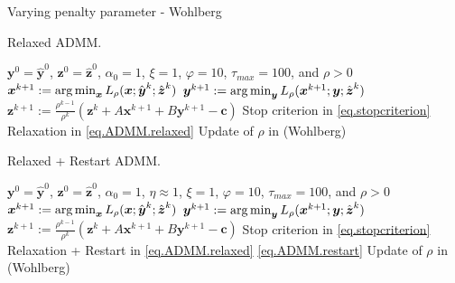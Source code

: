 \documentclass[8pt,red]{beamer}
\theoremstyle{plain}
\theoremstyle{definition}
\theoremstyle{remark}
\newcommand{\refalg}[1]{Algorithm~\ref{#1}}
\newcommand{\argmin}{\operatornamewithlimits{\mathrm{arg\,min}}}
\newcommand{\bi}[1]{\ensuremath{\boldsymbol{#1}}}
\begin{document}
\begin{frame}{Varying penalty parameter - Wohlberg}
\begin{algorithm}[H]
  \scriptsize
  \caption{Relaxed ADMM.}
  \label{alg:prototype.vp-R-Wohlberg}
  \begin{algorithmic}[1]
    \Require
    $\bi{y}^{0} = \hat{\bi{y}}^{0}$, $\bi{z}^{0}=\hat{\bi{z}}^{0}$, $\alpha_{0}=1$, $\xi = 1$, $\varphi = 10$, $\tau_{max} = 100$, and $\rho > 0$ 
    \State
    $\bi{x}^{k+1} 
    := \argmin_{\bi{x}} L_{\rho}(\bi{x};\hat{\bi{y}}^{k};\hat{\bi{z}}^{k})$ 
    \State
    $\bi{y}^{k+1} 
    := \argmin_{\bi{y}} L_{\rho}(\bi{x}^{k+1};\bi{y};\hat{\bi{z}}^{k})$ 
    \State
    $\bi{z}^{k+1} 
  := \frac{\rho^{k-1}}{\rho^{k}} \left( \bi{z}^{k} + A \bi{x}^{k+1} + B \bi{y}^{k+1} - \bi{c} \right)$ 
    \State
    Stop criterion in \eqref{eq.stopcriterion}
    \State
    Relaxation in \eqref{eq.ADMM.relaxed}
    \State
    Update of $\rho$ in (Wohlberg)
    \EndFor
  \end{algorithmic}
\end{algorithm}

\begin{algorithm}[H]
  \scriptsize
  \caption{Relaxed + Restart ADMM.}
  \label{alg:prototype.vp-RR-Wohlberg}
  \begin{algorithmic}[1]
    \Require
    $\bi{y}^{0} = \hat{\bi{y}}^{0}$, $\bi{z}^{0}=\hat{\bi{z}}^{0}$, 
    $\alpha_{0}=1$, $\eta \approx 1$, $\xi = 1$, $\varphi = 10$, $\tau_{max} = 100$, and $\rho > 0$ 
    \State
    $\bi{x}^{k+1} 
    := \argmin_{\bi{x}} L_{\rho}(\bi{x};\hat{\bi{y}}^{k};\hat{\bi{z}}^{k})$ 
    \State
    $\bi{y}^{k+1} 
    := \argmin_{\bi{y}} L_{\rho}(\bi{x}^{k+1};\bi{y};\hat{\bi{z}}^{k})$ 
    \State
    $\bi{z}^{k+1} 
  := \frac{\rho^{k-1}}{\rho^{k}} \left( \bi{z}^{k} + A \bi{x}^{k+1} + B \bi{y}^{k+1} - \bi{c} \right)$ 
    \State
    Stop criterion in \eqref{eq.stopcriterion}
    \State
    Relaxation + Restart in \eqref{eq.ADMM.relaxed} \eqref{eq.ADMM.restart}
    \State
    Update of $\rho$ in (Wohlberg)
    \EndFor
  \end{algorithmic}
\end{algorithm}
\end{frame}
\end{document}
